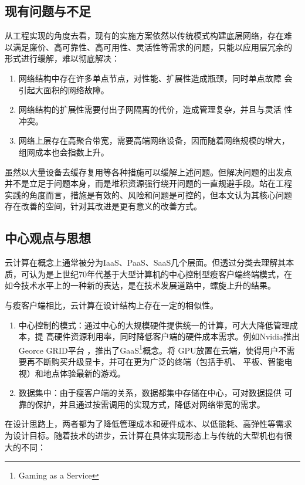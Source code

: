 \documentclass[oneside, phd]{njuthesis}
\begin{document}
\subsection{现有问题与不足}

从工程实现的角度去看，现有的实施方案依然以传统模式构建底层网络，存在难
以满足廉价、高可靠性、高可用性、灵活性等需求的问题，只能以应用层冗余的
形式进行缓解，难以彻底解决：

\begin{enumerate}
\item 网络结构中存在许多单点节点，对性能、扩展性造成瓶颈，同时单点故障
  会引起大面积的网络故障。
\item 网络结构的扩展性需要付出子网隔离的代价，造成管理复杂，并且与灵活
  性冲突。
\item 网络上层存在高聚合带宽，需要高端网络设备，因而随着网络规模的增大，
  组网成本也会指数上升。
\end{enumerate}

虽然以大量设备去缓存复用等各种措施可以缓解上述问题。但解决问题的出发点
并不是立足于问题本身，而是堆积资源强行绕开问题的一直规避手段。站在工程
实践的角度而言，措施是有效的、风险和问题是可控的，但本文认为其核心问题
存在改善的空间，针对其改进是更有意义的改善方式。

\subsection{中心观点与思想}

云计算在概念上通常被分为IaaS、PaaS、SaaS几个层面。但透过分类去理解其本
质，可认为是上世纪70年代基于大型计算机的中心控制型瘦客户端终端模式，在
如今技术水平上的一种新的表达，是在技术发展道路中，螺旋上升的结果。

与瘦客户端相比，云计算在设计结构上存在一定的相似性。

\begin{enumerate}
\item 中心控制的模式：通过中心的大规模硬件提供统一的计算，可大大降低管理成本，提
  高硬件资源利用率，同时降低客户端的硬件成本需求。例如Nvidia推出Georce GRID平台
  \cite{NVIDIAGRID}，推出了GaaS\footnote{Gaming as a Service}概念。将
  GPU放置在云端，使得用户不需要再不断购买升级显卡，并可在更为广泛的终端（包括手机、
  平板、智能电视）和地点体验最新的游戏。
\item 数据集中：由于瘦客户端的关系，数据都集中存储在中心，可对数据提供
  可靠的保护，并且通过按需调用的实现方式，降低对网络带宽的需求。
\end{enumerate}

在设计思路上，两者都为了降低管理成本和硬件成本、以低能耗、高弹性等需求
为设计目标。随着技术的进步，云计算在具体实现形态上与传统的大型机也有很
大的不同：
\end{document}
